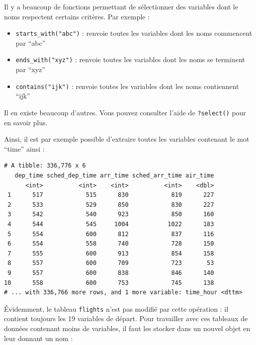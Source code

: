 \documentclass[a4paperpaper,]{article}
\newenvironment{Shaded}{\begin{snugshade}}{\end{snugshade}}
\newcommand{\KeywordTok}[1]{\textcolor[rgb]{0.12,0.11,0.11}{\textbf{#1}}}
\newcommand{\NormalTok}[1]{\textcolor[rgb]{0.12,0.11,0.11}{#1}}
\newcommand{\OperatorTok}[1]{\textcolor[rgb]{0.12,0.11,0.11}{#1}}
\newcommand{\StringTok}[1]{\textcolor[rgb]{0.75,0.01,0.01}{#1}}
\providecommand{\tightlist}{%
  \setlength{\itemsep}{0pt}\setlength{\parskip}{0pt}}
\begin{document}
Il y a beaucoup de fonctions permettant de sélectionner des variables dont le noms respectent certains critères. Par exemple :

\begin{itemize}
\tightlist
\item
  \texttt{starts\_with("abc")} : renvoie toutes les variables dont les noms commencent par ``abc''
\item
  \texttt{ends\_with("xyz")} : renvoie toutes les variables dont les noms se terminent par ``xyz''
\item
  \texttt{contains("ijk")} : renvoie toutes les variables dont les noms contiennent ``ijk''
\end{itemize}

Il en existe beaucoup d'autres. Vous pouvez consulter l'aide de \texttt{?select()} pour en savoir plus.

Ainsi, il est par exemple possible d'extraire toutes les variables contenant le mot ``time'' ainsi :

\begin{Shaded}
\end{Shaded}

\begin{verbatim}
# A tibble: 336,776 x 6
   dep_time sched_dep_time arr_time sched_arr_time air_time
      <int>          <int>    <int>          <int>    <dbl>
 1      517            515      830            819      227
 2      533            529      850            830      227
 3      542            540      923            850      160
 4      544            545     1004           1022      183
 5      554            600      812            837      116
 6      554            558      740            728      150
 7      555            600      913            854      158
 8      557            600      709            723       53
 9      557            600      838            846      140
10      558            600      753            745      138
# ... with 336,766 more rows, and 1 more variable: time_hour <dttm>
\end{verbatim}

Évidemment, le tableau \texttt{flights} n'est pas modifié par cette opération : il contient toujours les 19 variables de départ. Pour travailler avec ces tableaux de données contenant moins de variables, il faut les stocker dans un nouvel objet en leur donnant un nom :
\end{document}
